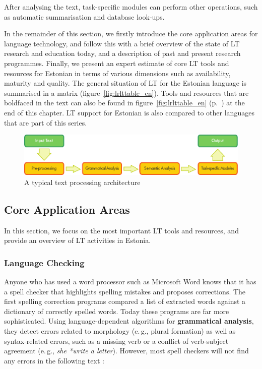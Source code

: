 \begin{multicols}{2}
After analysing the text, task-specific modules can perform other operations, such as automatic summarisation and database look-ups.

In the remainder of this section, we firstly introduce the core application areas for language technology, and follow this with a brief overview of the state of LT research and education today, and a description of past and present research programmes. Finally, we present an expert estimate of core LT tools and resources for Estonian in terms of various dimensions such as availability, maturity and quality. The general situation of LT for the Estonian language is summarised in a matrix (figure~\ref{fig:lrlttable_en}). Tools and resources that are boldfaced in the text can also be found in figure~\ref{fig:lrlttable_en} (p.~\pageref{fig:lrlttable_en}) at the end of this chapter. LT support for Estonian is also compared to other languages that are part of this series.

\begin{figure}[htb]
  \center
  \includegraphics[width=\textwidth]{../_media/english/text_processing_app_architecture}
  \caption{A typical text processing architecture}
  \label{fig:textprocessingarch_en}
\end{figure}

\subsection{Core Application Areas}

In this section, we focus on the most important LT tools and resources, and provide an overview of LT activities in Estonia. 

\subsubsection{Language Checking}

Anyone who has used a word processor such as Microsoft Word knows that it has a spell checker that highlights spelling mistakes and proposes corrections. The first spelling correction programs compared a list of extracted words against a dictionary of correctly spelled words. Today these programs are far more sophisticated. Using language-dependent algorithms for \textbf{grammatical analysis}, they detect errors related to morphology (e.\,g., plural formation) as well as syntax-related errors, such as a missing verb or a conflict of verb-subject agreement (e.\,g., \textit{she *write a letter}). However, most spell checkers will not find any errors in the following text \cite{zar1}:


\end{multicols}
